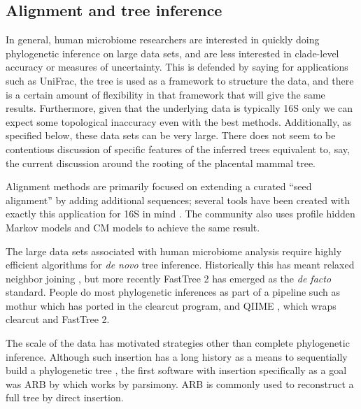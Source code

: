 \documentclass{amsart}
\begin{document}
\subsection{Alignment and tree inference}
In general, human microbiome researchers are interested in quickly doing phylogenetic inference on large data sets, and are less interested in clade-level accuracy or measures of uncertainty.
This is defended by saying for applications such as UniFrac, the tree is used as a framework to structure the data, and there is a certain amount of flexibility in that framework that will give the same results.
Furthermore, given that the underlying data is typically 16S only we can expect some topological inaccuracy even with the best methods.
Additionally, as specified below, these data sets can be very large.
There does not seem to be contentious discussion of specific features of the inferred trees equivalent to, say, the current discussion around the rooting of the placental mammal tree.

Alignment methods are primarily focused on extending a curated ``seed alignment'' by adding additional sequences; several tools have been created with exactly this application for 16S in mind \citep{desantis2006nast,caporaso2010pynast,pruesse2012sina}.
The community also uses profile hidden Markov models \citep{eddy1998profile} and CM models \citep{nawrocki2009infernal,nawrocki2009structural} to achieve the same result.

The large data sets associated with human microbiome analysis require highly efficient algorithms for \emph{de novo} tree inference.
Historically this has meant relaxed neighbor joining \citep{evans2006relaxed}, but more recently FastTree 2 \citep{price2010fasttree} has emerged as the \textit{de facto} standard.
People do most phylogenetic inferences as part of a pipeline such as mothur \citep{schloss2009introducing} which has ported in the clearcut \citep{sheneman2006clearcut} program, and QIIME \citep{caporaso2010qiime}, which wraps clearcut and FastTree 2.

The scale of the data has motivated strategies other than complete phylogenetic inference.
Although such insertion has a long history as a means to sequentially build a phylogenetic tree \citep{kluge1969quantitative}, the first software with insertion specifically as a goal was ARB by \citet{ludwig2004arb} which works by parsimony.
ARB is commonly used to reconstruct a full tree by direct insertion.
\end{document}
